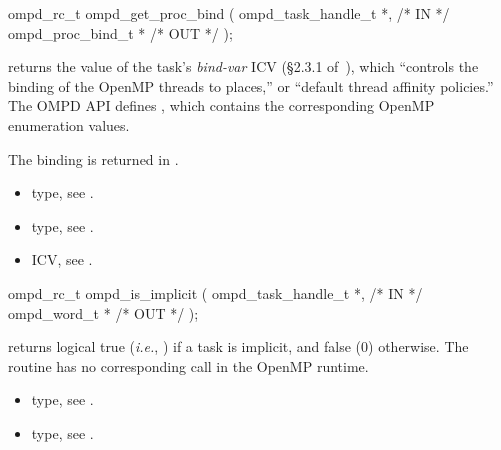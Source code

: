 %
\summary

\format
\cspecificstart
\begin{boxedcode}
ompd\_rc\_t ompd\_get\_proc\_bind (
  ompd\_task\_handle\_t        *,                           /* IN */
  ompd\_proc\_bind\_t          *                                  /* OUT */
); 
\end{boxedcode}
\cspecificend

\descr
{} returns the value of the task's
\emph{bind-var} ICV (\S2.3.1 of~\cite{OpenMP}), which ``controls the
binding of the OpenMP threads to places,'' or ``default thread
affinity policies.''
%
The OMPD API defines
, which
contains the corresponding OpenMP enumeration values.
%

\argdesc
The binding is returned in .
%

\crossreferences
\begin{itemize}
	\item {} type, see .
	\item {} type, see .
	\item {} ICV, see .
\end{itemize}

\summary

\format
\cspecificstart
\begin{boxedcode}
ompd\_rc\_t ompd\_is\_implicit (
  ompd\_task\_handle\_t  *,                                 /* IN */
  ompd\_word\_t        *                                         /* OUT */
); 
\end{boxedcode}
\cspecificend

\descr
{} returns logical true (\textit{i.e.}, )
if a task is implicit, and false (0) otherwise.
The routine has no corresponding call in the OpenMP runtime.

\argdesc

\crossreferences
\begin{itemize}
	\item {} type, see .
	\item {} type, see .
\end{itemize}



